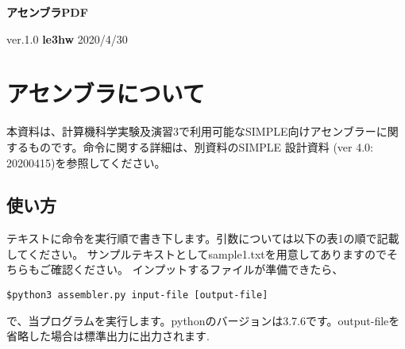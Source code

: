 \documentclass[11pt,a4j]{jarticle}%
\begin{document}
\begin{center}
{\huge \bf アセンブラPDF}
\end{center}
\begin{flushright}
ver.1.0 {\bf le3hw} 2020/4/30
\end{flushright}


\section{アセンブラについて}
本資料は、計算機科学実験及演習3で利用可能なSIMPLE向けアセンブラーに関するものです。命令に関する詳細は、別資料のSIMPLE 設計資料 (ver 4.0: 20200415)を参照してください。
\subsection{使い方}
テキストに命令を実行順で書き下します。引数については以下の表1の順で記載してください。
サンプルテキストとしてsample1.txtを用意してありますのでそちらもご確認ください。
インプットするファイルが準備できたら、
\begin{lstlisting}[label=fuga]
$python3 assembler.py input-file [output-file]
\end{lstlisting}
で、当プログラムを実行します。pythonのバージョンは3.7.6です。output-fileを省略した場合は標準出力に出力されます.
\end{document}
